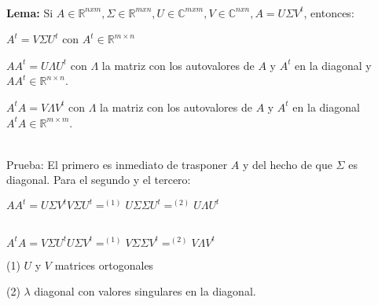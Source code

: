 \ \\
\textbf{Lema:} Si $A \in \mathbb{R}^{nxm},\Sigma \in \mathbb{R}^{mxn}, U \in \mathbb{C}^{mxm}, V \in
\mathbb{C}^{nxn}, A = U \Sigma V^t$, entonces:
\begin{compactitem}
  \item $A^t = V \Sigma U^t$ con $A^t \in \mathbb{R}^{m \times n}$
  \item $A A^t = U \Lambda U^t$ con $\Lambda$ la matriz con los autovalores de $A$ y $A^t$ en
    la diagonal y $A A^t \in \mathbb{R}^{n \times n}$.
  \item $A^t A = V \Lambda V^t $ con $\Lambda$ la matriz con los autovalores de $A$ y $A^t$ en
    la diagonal $A^t A \in \mathbb{R}^{m \times m}$.
\end{compactitem}

\ \\
Prueba: El primero es inmediato de trasponer $A$ y del hecho de que $\Sigma$ es diagonal. Para el
segundo y el tercero:
\begin{center}
$A A^t = U \Sigma V^t V \Sigma U^t =^{(1)} U \Sigma \Sigma U^t =^{(2)} U \Lambda U^t$

\ \\
$A^t A = V \Sigma U^t U \Sigma V^t =^{(1)} V \Sigma \Sigma V^t =^{(2)} V \Lambda V^t$
\end{center}

(1) $U$ y $V$ matrices ortogonales

(2) $\lambda$ diagonal con valores singulares en la diagonal.
